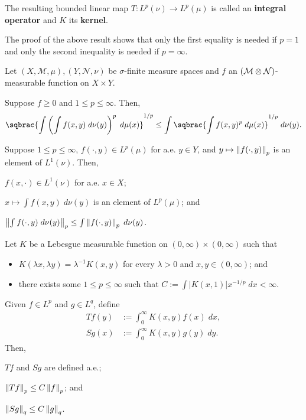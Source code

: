 \documentclass[11pt]{article}
\newcommand{\M}{\mathcal{M}}
\renewcommand{\N}{\mathcal{N}}
\begin{document}
The resulting bounded linear map $T: L^p(\nu)\to L^p(\mu)$ is called an \textbf{integral operator} and $K$ its \textbf{kernel}. 

\begin{remark}
The proof of the above result shows that only the first equality is needed if $p=1$ and only the second inequality is needed if $p=\infty$.
\end{remark}

\begin{proposition}
Let $(X,\M,\mu),(Y,\N,\nu)$ be $\sigma$-finite measure spaces and $f$ an $(\M\tensor\N)$-measurable function on $X\times Y$. 
\begin{enum}{\alph}
\item Suppose $f\geq0$ and $1\leq p\leq\infty$. Then,
\begin{align*}
\sqbrac{\int\paren{\int f(x,y)\;d\nu(y)}^p\;d\mu(x)}^{1/p}
\leq\int\sqbrac{\int f(x,y)^p\;d\mu(x)}^{1/p}\;d\nu(y).
\end{align*}

\item Suppose $1\leq p\leq\infty$, $f(\cdot,y)\in L^p(\mu)$ for a.e. $y\in Y$, and $y\mapsto\left\lVert f(\cdot,y)\right\rVert_p$ is an element of $L^1(\nu)$. Then,
\begin{enum}{\arabic}
\item $f(x,\cdot)\in L^1(\nu)$ for a.e. $x\in X$;
\item $x\mapsto\int f(x,y)\;d\nu(y)$ is an element of $L^p(\mu)$; and
\item $\left\lVert\int f(\cdot,y)\;d\nu(y)\right\rVert_p\leq\int\left\lVert f(\cdot,y)\right\rVert_p\;d\nu(y)$.
\end{enum}
\end{enum}
\end{proposition}

\begin{theorem}
Let $K$ be a Lebesgue measurable function on $(0,\infty)\times(0,\infty)$ such that
\begin{itemize}
\item $K(\lambda x,\lambda y)=\lambda^{-1}K(x,y)$ for every $\lambda>0$ and $x,y\in(0,\infty)$; and
\item there exists some $1\leq p\leq\infty$ such that $C:=\int|K(x,1)|x^{-1/p}\;dx<\infty$.
\end{itemize}
Given $f\in L^p$ and $g\in L^q$, define
\begin{align*}
Tf(y)&:=\int_0^{\infty}K(x,y)f(x)\;dx, \\
Sg(x)&:=\int_0^{\infty}K(x,y)g(y)\;dy.
\end{align*}
Then,
\begin{enum}{\alph}
\item $Tf$ and $Sg$ are defined a.e.;
\item $\left\lVert Tf\right\rVert_p\leq C\left\lVert f\right\rVert_p$; and
\item $\left\lVert Sg\right\rVert_q\leq C\left\lVert g\right\rVert_q$.
\end{enum}
\end{theorem}
\end{document}
